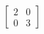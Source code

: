 \documentclass[preview]{standalone}
\begin{document}
\begin{align*}
\begin{bmatrix} 2 & 0 \\ 0 & 3 \end{bmatrix}
\end{align*}
\end{document}
